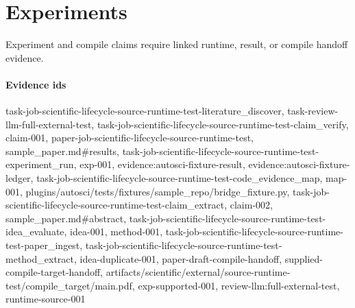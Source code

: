 \section{Experiments}
Experiment and compile claims require linked runtime, result, or compile handoff evidence.

\paragraph{Evidence ids} task-job-scientific-lifecycle-source-runtime-test-literature\_discover, task-review-llm-full-external-test, task-job-scientific-lifecycle-source-runtime-test-claim\_verify, claim-001, paper-job-scientific-lifecycle-source-runtime-test, sample\_paper.md\#results, task-job-scientific-lifecycle-source-runtime-test-experiment\_run, exp-001, evidence:autosci-fixture-result, evidence:autosci-fixture-ledger, task-job-scientific-lifecycle-source-runtime-test-code\_evidence\_map, map-001, plugins/autosci/tests/fixtures/sample\_repo/bridge\_fixture.py, task-job-scientific-lifecycle-source-runtime-test-claim\_extract, claim-002, sample\_paper.md\#abstract, task-job-scientific-lifecycle-source-runtime-test-idea\_evaluate, idea-001, method-001, task-job-scientific-lifecycle-source-runtime-test-paper\_ingest, task-job-scientific-lifecycle-source-runtime-test-method\_extract, idea-duplicate-001, paper-draft-compile-handoff, supplied-compile-target-handoff, artifacts/scientific/external/source-runtime-test/compile\_target/main.pdf, exp-supported-001, review-llm:full-external-test, runtime-source-001
